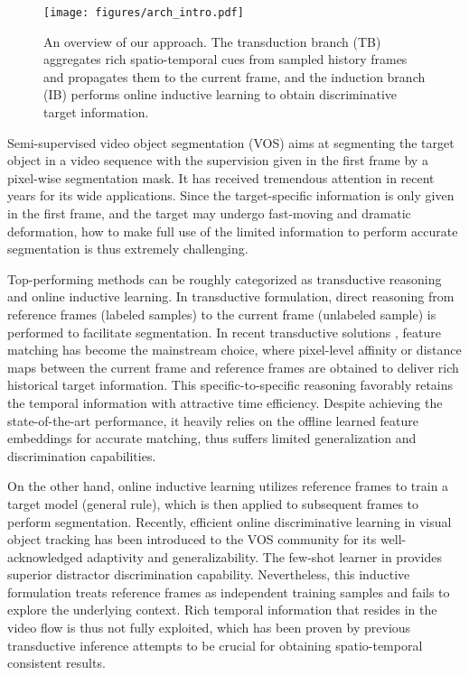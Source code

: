 \documentclass[10pt,twocolumn,letterpaper]{article}
\begin{document}
\begin{figure}[t]
	\begin{center}
	\texttt{[image: figures/arch\_intro.pdf]}
	\vspace{-2.0em}
	\end{center}
\caption{An overview of our approach. The transduction branch (TB) aggregates rich spatio-temporal cues from sampled history frames and propagates them to the current frame, and the induction branch (IB) performs online inductive learning to obtain discriminative target information.}
	\label{fig:intro}
	\vspace{-1.0em}
\end{figure}

Semi-supervised video object segmentation (VOS) aims at segmenting the target object in a video sequence with the supervision given in the first frame by a pixel-wise segmentation mask. It has received tremendous attention in recent years for its wide applications. Since the target-specific information is only given in the first frame, and the target may undergo fast-moving and dramatic deformation, how to make full use of the limited information to perform accurate segmentation is thus extremely challenging.

Top-performing methods can be roughly categorized as transductive reasoning and online inductive learning. In transductive formulation, direct reasoning from reference frames (labeled samples) to the current frame (unlabeled sample) is performed to facilitate segmentation.
In recent transductive solutions \cite{contrastrandomwalk2020A,mast2020A,lu2020A,Seoung2019A,Seong2020A,colorvideo2018,ContrastiveWN2021A,CFBI2020A}, feature matching has become the mainstream choice, where pixel-level affinity or distance maps between the current frame and reference frames are obtained to deliver rich historical target information. This specific-to-specific reasoning favorably retains the temporal information with attractive time efficiency. Despite achieving the state-of-the-art performance, it heavily relies on the offline learned feature embeddings for accurate matching, thus suffers limited generalization and discrimination capabilities.

On the other hand, online inductive learning utilizes reference frames to train a target model (general rule), which is then applied to subsequent frames to perform segmentation.
Recently, efficient online discriminative learning \cite{dimp2019A,atom2019A} in visual object tracking has been introduced to the VOS community for its well-acknowledged adaptivity and generalizability. The few-shot learner in \cite{Goutam2020A,frtm2020A} provides superior distractor discrimination capability. 
Nevertheless, this inductive formulation treats reference frames as independent training samples and fails to explore the underlying context. Rich temporal information that resides in the video flow is thus not fully exploited, which has been proven by previous transductive inference attempts \cite{Seoung2019A,Zhang2020A} to be crucial for obtaining spatio-temporal consistent results.
\end{document}
